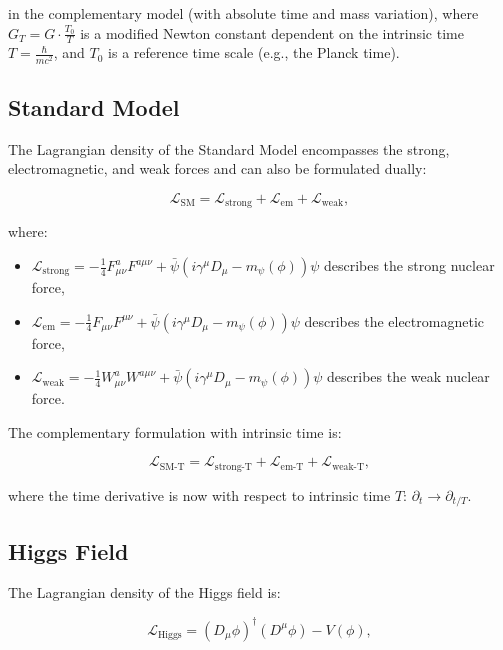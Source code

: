 \documentclass{article}
\begin{document}
in the complementary model (with absolute time and mass variation), where \(G_T = G \cdot \frac{T_0}{T}\) is a modified Newton constant dependent on the intrinsic time \(T = \frac{\hbar}{mc^2}\), and \(T_0\) is a reference time scale (e.g., the Planck time).

\subsection{Standard Model}
The Lagrangian density of the Standard Model encompasses the strong, electromagnetic, and weak forces and can also be formulated dually:

\begin{equation}
	\mathcal{L}_\text{SM} = \mathcal{L}_\text{strong} + \mathcal{L}_\text{em} + \mathcal{L}_\text{weak},
\end{equation}

where:
\begin{itemize}
	\item \(\mathcal{L}_\text{strong} = -\frac{1}{4} F_{\mu\nu}^a F^{a\mu\nu} + \bar{\psi}(i \gamma^\mu D_\mu - m_\psi(\phi))\psi\) describes the strong nuclear force,
	\item \(\mathcal{L}_\text{em} = -\frac{1}{4} F_{\mu\nu} F^{\mu\nu} + \bar{\psi}(i \gamma^\mu D_\mu - m_\psi(\phi))\psi\) describes the electromagnetic force,
	\item \(\mathcal{L}_\text{weak} = -\frac{1}{4} W_{\mu\nu}^a W^{a\mu\nu} + \bar{\psi}(i \gamma^\mu D_\mu - m_\psi(\phi))\psi\) describes the weak nuclear force.
\end{itemize}

The complementary formulation with intrinsic time is:

\begin{equation}
	\mathcal{L}_\text{SM-T} = \mathcal{L}_\text{strong-T} + \mathcal{L}_\text{em-T} + \mathcal{L}_\text{weak-T},
\end{equation}

where the time derivative is now with respect to intrinsic time \(T\): \(\partial_t \rightarrow \partial_{t/T}\).

\subsection{Higgs Field}
The Lagrangian density of the Higgs field is:

\begin{equation}
	\mathcal{L}_\text{Higgs} = (D_\mu \phi)^\dagger (D^\mu \phi) - V(\phi),
\end{equation}
\end{document}
